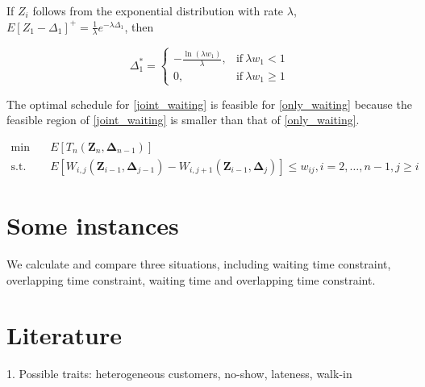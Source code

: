 \documentclass{article}
\newcommand{\Z}{\mathbf{Z}}
\newcommand{\D}{\bm{\Delta}}
\begin{document}
If $Z_{i}$ follows from the exponential distribution with rate $\lambda$, $E\left[Z_{1}- \Delta_{1} \right]^{+} = \frac{1}{\lambda} e^{-\lambda \Delta_{1}}$, then

\begin{equation*}
	\Delta_{1}^{*} = \begin{cases}
	-\frac{\ln (\lambda w_{1})}{\lambda}, & \text{if}~ \lambda w_{1} < 1 \\
	0, & \text{if}~ \lambda w_{1} \geq 1	
	\end{cases}
\end{equation*}

\vspace{10cm}

The optimal schedule for \eqref{joint_waiting} is feasible for \eqref{only_waiting} because the feasible region of \eqref{joint_waiting} is smaller than that of \eqref{only_waiting}.

\begin{equation}\label{only_waiting}
    \begin{aligned}
        \min \quad & E \left[T_n(\Z_{n}, \D_{n-1}) \right] \\
        \mbox{s.t.} \quad & E\left[W_{i,j}(\Z_{i-1}, \D_{j-1})-W_{i,j+1}(\Z_{i-1}, \D_{j}) \right] \leq w_{ij}, i =2, \ldots, n-1, j \geq i
    \end{aligned}
\end{equation}



\section{Some instances}
We calculate and compare three situations, including waiting time constraint, overlapping time constraint, waiting time and overlapping time constraint.





\newpage


\section{Literature}

1. Possible traits: heterogeneous customers, no-show, lateness, walk-in
\end{document}
